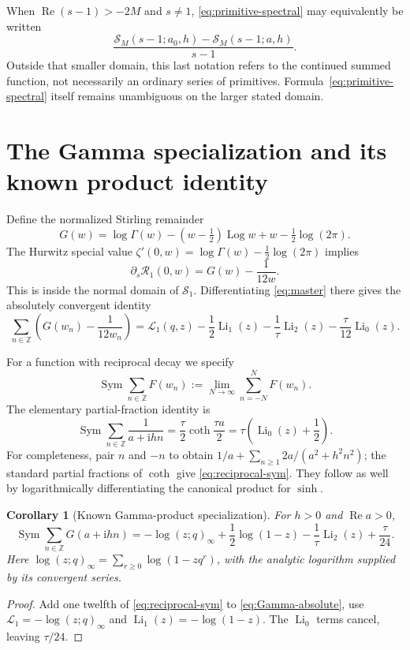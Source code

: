 \documentclass[11pt,a4paper]{article}
\numberwithin{equation}{section}
\newtheorem{corollary}[theorem]{Corollary}
\theoremstyle{definition}
\theoremstyle{remark}
\DeclareMathOperator{\Li}{Li}
\DeclareMathOperator{\Log}{Log}
\DeclareMathOperator{\Ree}{Re}
\DeclareMathOperator{\Sym}{Sym}
\newcommand{\ii}{\mathrm i}
\newcommand{\Z}{\mathbb Z}
\newcommand{\Rcal}{\mathcal R}
\newcommand{\Lcal}{\mathcal L}
\newcommand{\Scal}{\mathcal S}
\begin{document}
When $\Ree(s-1)>-2M$ and $s\ne1$, \eqref{eq:primitive-spectral}
may equivalently be written
\[
 \frac{\Scal_M(s-1;a_0,h)-\Scal_M(s-1;a,h)}{s-1}.
\]
Outside that smaller domain, this last notation refers to the
continued summed function, not necessarily an ordinary series of
primitives. Formula~\eqref{eq:primitive-spectral} itself remains
unambiguous on the larger stated domain.

\section{The Gamma specialization and its known product identity}
\label{sec:gamma}

Define the normalized Stirling remainder
\begin{equation}\label{eq:G}
 G(w)=\log\Gamma(w)-(w-\tfrac12)\Log w+w-\tfrac12\log(2\pi).
\end{equation}
The Hurwitz special value $\zeta'(0,w)=\log\Gamma(w)-\tfrac12\log(2\pi)$
implies
\begin{equation}\label{eq:Gamma-jet}
 \partial_s\Rcal_1(0,w)=G(w)-\frac1{12w}.
\end{equation}
This is inside the normal domain of $\Scal_1$. Differentiating
\eqref{eq:master} there gives the absolutely convergent identity
\begin{equation}\label{eq:Gamma-absolute}
 \sum_{n\in\Z}\left(G(w_n)-\frac1{12w_n}\right)
 =\Lcal_1(q,z)-\frac12\Li_1(z)-\frac1\tau\Li_2(z)
                         -\frac\tau{12}\Li_0(z).
\end{equation}

For a function with reciprocal decay we specify
\[
 \Sym\sum_{n\in\Z}F(w_n):=\lim_{N\to\infty}\sum_{n=-N}^{N}F(w_n).
\]
The elementary partial-fraction identity is
\begin{equation}\label{eq:reciprocal-sym}
 \Sym\sum_{n\in\Z}\frac1{a+\ii hn}
     =\frac\tau2\coth\frac{\tau a}{2}
     =\tau\left(\Li_0(z)+\frac12\right).
\end{equation}
For completeness, pair $n$ and $-n$ to obtain
$1/a+\sum_{n\ge1}2a/(a^2+h^2n^2)$; the standard partial fractions
of $\coth$ give \eqref{eq:reciprocal-sym}. They follow as well by
logarithmically differentiating the canonical product for $\sinh$.

\begin{corollary}[Known Gamma-product specialization]
\label{cor:Gamma}
For $h>0$ and $\Ree a>0$,
\begin{equation}\label{eq:Gamma-symmetric}
 \boxed{\displaystyle
 \Sym\sum_{n\in\Z}G(a+\ii hn)
  =-\log(z;q)_\infty+\frac12\log(1-z)
       -\frac1\tau\Li_2(z)+\frac\tau{24}.}
\end{equation}
Here $\log(z;q)_\infty=\sum_{r\ge0}\log(1-zq^r)$, with the
analytic logarithm supplied by its convergent series.
\end{corollary}
\begin{proof}
Add one twelfth of \eqref{eq:reciprocal-sym} to
\eqref{eq:Gamma-absolute}, use
$\Lcal_1=-\log(z;q)_\infty$ and $\Li_1(z)=-\log(1-z)$.
The $\Li_0$ terms cancel, leaving $\tau/24$.
\end{proof}
\end{document}
